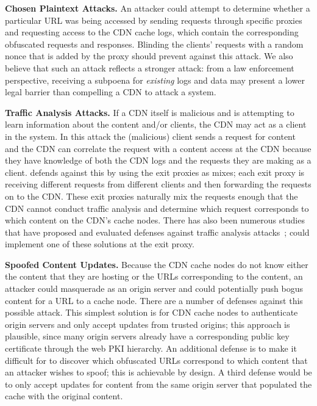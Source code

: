 \textbf{Chosen Plaintext Attacks.} An attacker could attempt to
determine whether a particular URL was being accessed by sending requests
through specific \system{} proxies and requesting access to the CDN cache logs, 
which contain the corresponding obfuscated
requests and responses. Blinding the clients' requests
with a random nonce that is added by the proxy should prevent against this
attack. We also believe that such an attack reflects a stronger attack: from a
law enforcement perspective, receiving a subpoena for {\em existing} logs and
data may present a lower legal barrier than compelling a CDN to attack a
system.

\textbf{Traffic Analysis Attacks.} If a CDN itself is malicious and is attempting 
to learn information about the content and/or clients, the CDN may act as a client 
in the system.  In this attack the (malicious) client sends a request for content 
and the CDN can correlate the request with a content access at the CDN because they have 
knowledge of both the CDN logs and the requests they are making as a client.  \system{} 
defends against this by using the exit proxies as  mixes; each exit proxy is receiving 
different requests from different clients and then forwarding the requests on to the CDN.  
These exit proxies naturally mix the requests enough that the CDN cannot conduct traffic analysis
 and determine which request corresponds to which content on the CDN's cache nodes.  There has 
also been numerous studies that have proposed and evaluated defenses against traffic 
analysis attacks~\cite{wright2009traffic,rackoff1993cryptographic}; \system{} could implement one of these solutions  at the exit 
proxy.

\textbf{Spoofed Content Updates.} Because the CDN cache
nodes do not know either the content that they are hosting or the URLs
corresponding to the content, an attacker could masquerade as an origin server
and could potentially push bogus content for a URL to a cache node. There are
a number of defenses against this possible attack. This simplest solution is
for CDN cache nodes to authenticate origin servers and only accept updates
from trusted origins; this approach is plausible, since many origin servers already
have a corresponding public key certificate through the web PKI hierarchy.  An additional
defense is to make it difficult for to discover which obfuscated URLs correspond
to which content that an attacker wishes to spoof; this is achievable by design.
A third defense would be to only accept updates for content from the same origin
server that populated the cache with the original content.

